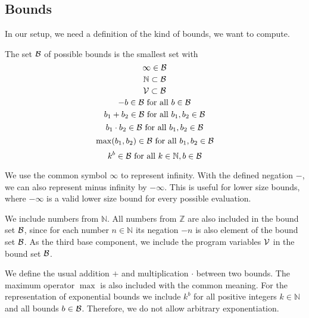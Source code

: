 \subsection{Bounds}

In our setup, we need a definition of the kind of bounds, we want to compute.

\begin{definition}
  The set $\mathcal{B}$ of possible bounds is the smallest set with
  \[ \infty \in \mathcal{B} \]
  \[ \mathbb{N} \subset \mathcal{B} \] 
  \[ \mathcal{V} \subset \mathcal{B} \] 
  \[ -b \in \mathcal{B} \text{ for all } b \in \mathcal{B} \] 
  \[ b_1 + b_2 \in \mathcal{B} \text{ for all } b_1, b_2 \in \mathcal{B} \] 
  \[ b_1 \cdot b_2 \in \mathcal{B} \text{ for all } b_1, b_2 \in \mathcal{B} \] 
  \[ \max(b_1, b_2) \in \mathcal{B} \text{ for all } b_1, b_2 \in \mathcal{B} \]
  \[ k^b \in \mathcal{B} \text{ for all } k \in \mathbb{N}, b \in \mathcal{B} \]
\end{definition}

We use the common symbol $\infty$ to represent infinity.
With the defined negation $-$, we can also represent minus infinity by $-\infty$.
This is useful for lower size bounds, where $-\infty$ is a valid lower size bound for every possible evaluation.

We include numbers from $\mathbb{N}$.
All numbers from $\mathbb{Z}$ are also included in the bound set $\mathcal{B}$, since for each number $n \in \mathbb{N}$ its negation $-n$ is also element of the bound set $\mathcal{B}$.
As the third base component, we include the program variables $\mathcal{V}$ in the bound set $\mathcal{B}$.

We define the usual addition $+$ and multiplication $\cdot$ between two bounds.
The maximum operator $\max$ is also included with the common meaning.
For the representation of exponential bounds we include $k^b$ for all positive integers $k \in \mathbb{N}$ and all bounds $b \in \mathcal{B}$.
Therefore, we do not allow arbitrary exponentiation.

